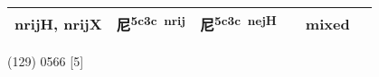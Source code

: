 \documentclass[14pt,a4paper]{scrartcl}
\begin{document}
\begin{longtable}[c]{@{}llllll@{}}
\begin{minipage}[t]{0.14\columnwidth}
nrijH, nrijX
\strut\end{minipage} &
\begin{minipage}[t]{0.14\columnwidth}\raggedright\strut
尼\textsuperscript{5c3c~nrij}
\strut\end{minipage} &
\begin{minipage}[t]{0.14\columnwidth}\raggedright\strut
尼\textsuperscript{5c3c~nejH}
\strut\end{minipage} &
\begin{minipage}[t]{0.14\columnwidth}\raggedright\strut
\strut\end{minipage} &
\begin{minipage}[t]{0.14\columnwidth}\raggedright\strut
mixed
\strut\end{minipage}\tabularnewline
\bottomrule
\end{longtable}

(129) 0566 {[}5{]}
\end{document}
